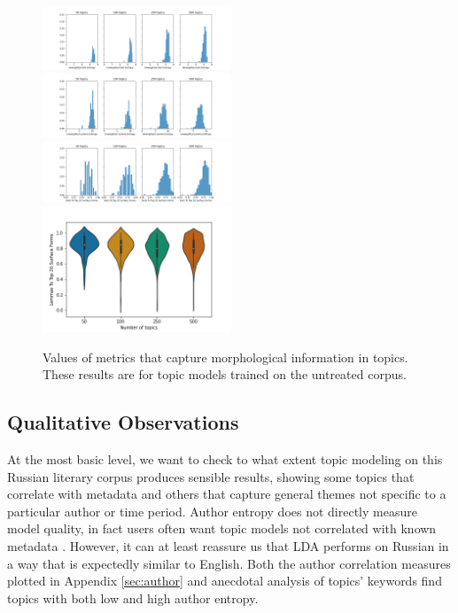 \documentclass[11pt,a4paper]{article}
\begin{document}
\begin{figure}[t]
    \includegraphics[width=0.5\textwidth]{unweighted_slot_entropy.png}
    \includegraphics[width=0.5\textwidth]{unweighted_lemma_entropy.png}
    \includegraphics[width=0.5\textwidth]{slots_to_top_20_surface_forms.png}
    \includegraphics[width=0.5\textwidth]{lemmas_to_top_20_surface_forms.png}
    \caption{Values of metrics that capture morphological information in topics. These results are for topic models trained on the untreated corpus.}
    \label{fig:slot_lemma_figs}
\end{figure}


\subsection{Qualitative Observations}
At the most basic level, we want to check to what extent topic modeling on this Russian literary corpus produces sensible results, showing some topics that correlate with metadata and others that capture general themes not specific to a particular author or time period. Author entropy does not directly measure model quality, in fact users often want topic models not correlated with known metadata \cite{Thompson2018AuthorlessTM}. However, it can at least reassure us that LDA performs on Russian in a way that is expectedly similar to English. Both the author correlation measures plotted in Appendix \ref{sec:author} and anecdotal analysis of topics' keywords find topics with both low and high author entropy.
\end{document}
